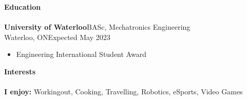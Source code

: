 \documentclass[a4paper]{article}
\newcommand{\lineunder} {
    \vspace{-8pt} \\
    \hspace{-18pt} \hrulefill \\
}
\newcommand{\header} [1] {
    {\hspace{-18pt}\vspace*{6pt} \textcolor{headerGray}{\textbf{\large{#1}}}}
    \vspace{-6pt} \lineunder
}
\begin{document}
\header{Education}
\textbf{\normalsize University of Waterloo}\hfill BASc, Mechatronics Engineering\\
\textcolor{educationGray}{\small Waterloo, ON\hfill Expected May 2023}
\vspace{-2mm}
\begin{itemize}[leftmargin=1cm]\itemsep -0.5pt
	\item Engineering International Student Award
\end{itemize}
\vspace{1mm}

\header{Interests}
\textbf{I enjoy: } Workingout, Cooking, Travelling, Robotics, eSports, Video Games\\
\vspace{1cm}
\end{document}
